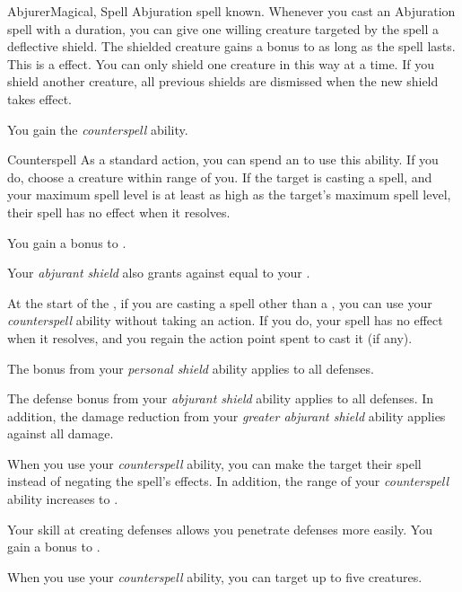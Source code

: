     \begin{feat}{Abjurer}{Magical, Spell}
        \featpre Abjuration spell known.
         Whenever you cast an Abjuration spell with a duration, you can give one willing creature targeted by the spell a deflective shield.
        The shielded creature gains a  bonus to  as long as the spell lasts.
        This is a   effect.
        You can only shield one creature in this way at a time.
        If you shield another creature, all previous shields are dismissed when the new shield takes effect.

         You gain the \textit{counterspell} ability.
        \begin{ability}{Counterspell}
            As a standard action, you can spend an  to use this ability.
            If you do, choose a creature within \rngmed range of you.
            If the target is casting a spell, and your maximum spell level is at least as high as the target's maximum spell level, their spell has no effect when it resolves.
        \end{ability}

         You gain a  bonus to .

         Your \textit{abjurant shield} also grants  against  equal to your .

         At the start of the , if you are casting a spell other than a , you can use your \textit{counterspell} ability without taking an action.
        If you do, your spell has no effect when it resolves, and you regain the action point spent to cast it (if any).

         The bonus from your \textit{personal shield} ability applies to all defenses.

         The defense bonus from your \textit{abjurant shield} ability applies to all defenses.
        In addition, the damage reduction from your \textit{greater abjurant shield} ability applies against all damage.

         When you use your \textit{counterspell} ability, you can make the target  their spell instead of negating the spell's effects.
        In addition, the range of your \textit{counterspell} ability increases to \rnglong.

         Your skill at creating defenses allows you penetrate defenses more easily.
        You gain a  bonus to .

         When you use your \textit{counterspell} ability, you can target up to five creatures.
    \end{feat}


